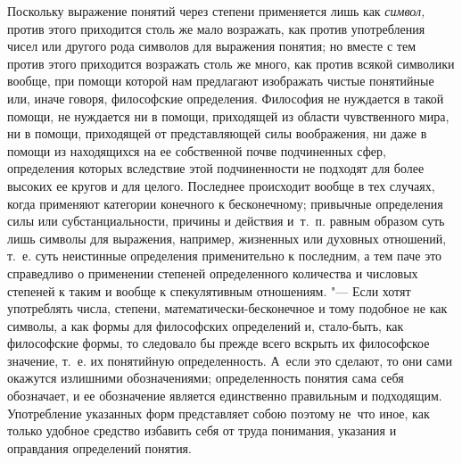 Поскольку выражение понятий через степени применяется лишь как {\em символ,}
против этого приходится столь же мало возражать, как против употребления чисел
или другого рода символов для выражения понятия; но вместе с тем против этого
приходится возражать столь же много, как против всякой символики вообще, при
помощи которой нам предлагают изображать чистые понятийные или, иначе говоря,
философские определения. Философия не нуждается в такой помощи, не нуждается ни
в помощи, приходящей из области чувственного мира, ни в помощи, приходящей от
представляющей силы воображения, ни даже в помощи из находящихся на ее
собственной почве подчиненных сфер, определения которых вследствие этой
подчиненности не подходят для более высоких ее кругов и для целого. Последнее
происходит вообще в тех случаях, когда применяют категории конечного к
бесконечному; привычные определения силы или субстанциальности, причины и
действия и~т.~п. равным образом суть лишь символы для выражения, например,
жизненных или духовных отношений, т.~е. суть неистинные определения
применительно к последним, а тем паче это справедливо о применении степеней
определенного количества и числовых степеней к таким и вообще к спекулятивным
отношениям. "--- Если хотят употреблять числа, степени,
математически-бесконечное и тому подобное не как символы, а как формы для
философских определений и, стало-быть, как философские формы, то следовало бы
прежде всего вскрыть их философское значение, т.~е. их понятийную
определенность. А~если это сделают, то они сами окажутся излишними
обозначениями; определенность понятия сама себя обозначает, и ее обозначение
является единственно правильным и подходящим. Употребление указанных форм
представляет собою поэтому не~что иное, как только удобное средство избавить
себя от труда понимания, указания и оправдания определений понятия.

\bigskip
